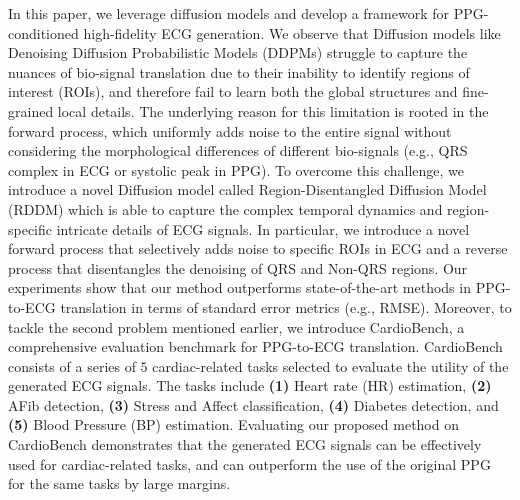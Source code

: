 \documentclass[letterpaper]{article} %
\begin{document}
In this paper, we leverage diffusion models \cite{sohl2015deep} and develop a framework for PPG-conditioned high-fidelity ECG generation. We observe that Diffusion models like Denoising Diffusion Probabilistic Models (DDPMs) \cite{ho2020denoising} struggle to capture the nuances of bio-signal translation due to their inability to identify regions of interest (ROIs), and therefore fail to learn both the global structures and fine-grained local details. The underlying reason for this limitation is rooted in the forward process, which uniformly adds noise to the entire signal without considering the morphological differences of different bio-signals (e.g., QRS complex in ECG or systolic peak in PPG). To overcome this challenge, we introduce a novel Diffusion model called Region-Disentangled Diffusion Model (RDDM) which is able to capture the complex temporal dynamics and region-specific intricate details of ECG signals. In particular, we introduce a novel forward process that selectively adds noise to specific ROIs in ECG and a reverse process that disentangles the denoising of QRS and Non-QRS regions.
Our experiments show that our method outperforms state-of-the-art methods in PPG-to-ECG translation in terms of standard error metrics (e.g., RMSE). Moreover, to tackle the second problem mentioned earlier, we introduce CardioBench, a comprehensive evaluation benchmark for PPG-to-ECG translation. CardioBench consists of a series of $5$ cardiac-related tasks selected to evaluate the utility of the generated ECG signals. The tasks
include \textbf{(1)} Heart rate (HR) estimation, \textbf{(2)} AFib detection, \textbf{(3)} Stress and Affect classification, \textbf{(4)} Diabetes detection, and \textbf{(5)} Blood Pressure (BP) estimation. Evaluating our proposed method on CardioBench demonstrates that the generated ECG signals can be effectively used for cardiac-related tasks, and can outperform the use of the original PPG for the same tasks by large margins.
\end{document}
